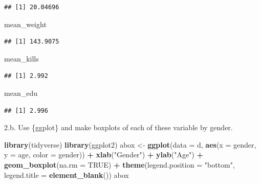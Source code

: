 \documentclass[]{article}
\newenvironment{Shaded}{\begin{snugshade}}{\end{snugshade}}
\newcommand{\KeywordTok}[1]{\textcolor[rgb]{0.13,0.29,0.53}{\textbf{#1}}}
\newcommand{\DataTypeTok}[1]{\textcolor[rgb]{0.13,0.29,0.53}{#1}}
\newcommand{\StringTok}[1]{\textcolor[rgb]{0.31,0.60,0.02}{#1}}
\newcommand{\OtherTok}[1]{\textcolor[rgb]{0.56,0.35,0.01}{#1}}
\newcommand{\OperatorTok}[1]{\textcolor[rgb]{0.81,0.36,0.00}{\textbf{#1}}}
\newcommand{\NormalTok}[1]{#1}
\begin{document}
\begin{verbatim}
## [1] 20.04696
\end{verbatim}

\begin{Shaded}
\begin{Highlighting}[]
\NormalTok{mean_weight}
\end{Highlighting}
\end{Shaded}

\begin{verbatim}
## [1] 143.9075
\end{verbatim}

\begin{Shaded}
\begin{Highlighting}[]
\NormalTok{mean_kills}
\end{Highlighting}
\end{Shaded}

\begin{verbatim}
## [1] 2.992
\end{verbatim}

\begin{Shaded}
\begin{Highlighting}[]
\NormalTok{mean_edu}
\end{Highlighting}
\end{Shaded}

\begin{verbatim}
## [1] 2.996
\end{verbatim}

2.b. Use \{ggplot\} and make boxplots of each of these variable by
gender.

\begin{Shaded}
\begin{Highlighting}[]
\KeywordTok{library}\NormalTok{(tidyverse)}
\KeywordTok{library}\NormalTok{(ggplot2)}
\NormalTok{abox <-}\StringTok{ }\KeywordTok{ggplot}\NormalTok{(}\DataTypeTok{data =}\NormalTok{ d, }\KeywordTok{aes}\NormalTok{(}\DataTypeTok{x =}\NormalTok{ gender, }\DataTypeTok{y =}\NormalTok{ age, }\DataTypeTok{color =}\NormalTok{ gender)) }\OperatorTok{+}\StringTok{ }\KeywordTok{xlab}\NormalTok{(}\StringTok{"Gender"}\NormalTok{) }\OperatorTok{+}\StringTok{ }\KeywordTok{ylab}\NormalTok{(}\StringTok{"Age"}\NormalTok{) }\OperatorTok{+}\StringTok{ }\KeywordTok{geom_boxplot}\NormalTok{(}\DataTypeTok{na.rm =} \OtherTok{TRUE}\NormalTok{) }\OperatorTok{+}\StringTok{ }\KeywordTok{theme}\NormalTok{(}\DataTypeTok{legend.position =} \StringTok{"bottom"}\NormalTok{, }\DataTypeTok{legend.title =} \KeywordTok{element_blank}\NormalTok{())}
\NormalTok{abox}
\end{Highlighting}
\end{Shaded}
\end{document}
